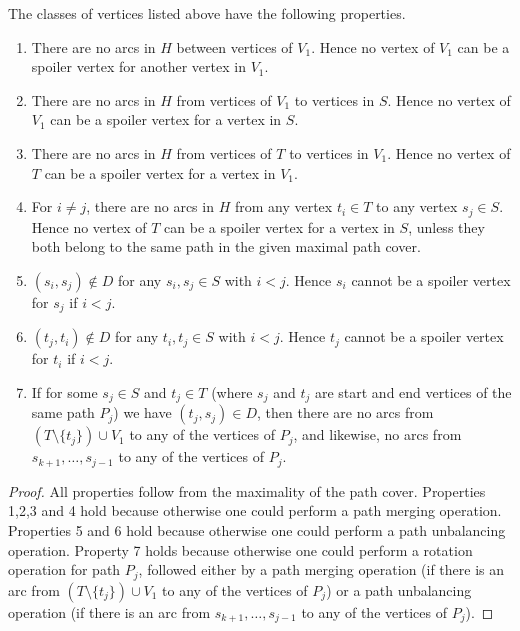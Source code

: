 \begin{lemma}
	\label{lem:properties}
The classes of vertices listed above have the following properties. %
	\begin{enumerate}
		\item There are no arcs in $H$ between vertices of $V_1$. Hence no vertex of $V_1$ can be a spoiler vertex for another vertex in $V_1$.
		\item There are no arcs in $H$ from vertices of $V_1$ to vertices in $S$. Hence no vertex of $V_1$ can be a spoiler vertex for a vertex in $S$.
		\item There are no arcs in $H$ from vertices of $T$ to vertices in $V_1$. Hence no vertex of $T$ can be a spoiler vertex for a vertex in $V_1$.
		\item For $i \not= j$, there are no arcs in $H$ from any vertex $t_i\in T$ to any vertex $s_j \in S$. Hence no vertex of $T$ can be a spoiler vertex for a vertex in $S$, unless they both belong to the same path in the given maximal path cover.
		\item $(s_i,s_j) \not\in D$ for any $s_i,s_j \in S$ with $i < j$.  Hence $s_i$ cannot be a spoiler vertex for $s_j$ if $i < j$.
		\item $(t_j,t_i) \not\in D$ for any $t_i,t_j \in S$ with $i < j$.  Hence $t_j$ cannot be a spoiler vertex for $t_i$ if $i < j$.
		\item If for some $s_j \in S$ and $t_j \in T$ (where $s_j$ and $t_j$ are start and end vertices of the same path $P_j$) 
%
we have  %
$(t_j,s_j)\in D$, then there are no arcs from $(T \setminus \{t_j\}) \cup V_1$ to any of the vertices of $P_j$, and likewise, no arcs from $s_{k+1}, \ldots, s_{j-1}$ to any of the vertices of $P_j$.
	\end{enumerate}
\end{lemma}

\begin{proof}
	All properties follow from the maximality of the path cover. Properties 1,2,3 and 4 hold because otherwise one could perform a path merging operation. Properties 5 and 6 hold because otherwise one could perform a path unbalancing operation. Property 7 holds because otherwise one could perform a rotation operation for path $P_j$, followed either by a path merging operation (if there is an arc from $(T \setminus \{t_j\}) \cup V_1$ to any of the vertices of $P_j$) or a path unbalancing operation (if there is an arc from $s_{k+1}, \ldots, s_{j-1}$ to any of the vertices of $P_j$).
\end{proof}

